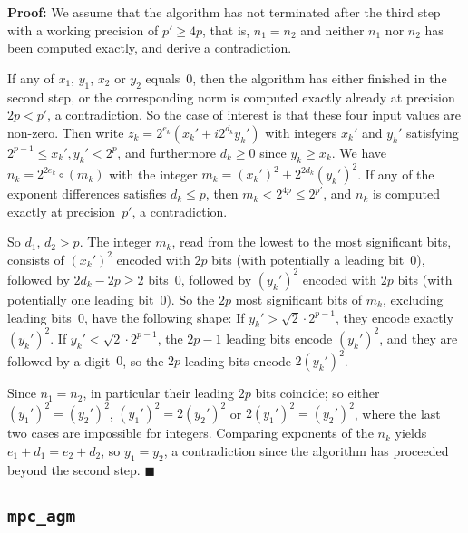 \documentclass [11pt]{article}
\newcommand {\round}{\operatorname {\circ}}
\renewcommand {\leq}{\leqslant}
\renewcommand {\geq}{\geqslant}
\newenvironment{proof}{\noindent \textbf {Proof:}}{{\hspace* {\fill}$\blacksquare$}}
\begin{document}
\begin {proof}
We assume that the algorithm has not terminated after the third step with a
working precision of $p' \geq 4p$, that is, $n_1 = n_2$ and neither
$n_1$ nor $n_2$ has been computed exactly, and derive a contradiction.

If any of $x_1$, $y_1$, $x_2$ or $y_2$ equals~$0$, then the algorithm has
either finished in the second step, or the corresponding norm is computed
exactly already at precision $2p < p'$, a contradiction.
So the case of interest is that these four input values are non-zero.
Then write $z_k = 2^{e_k} (x_k' + i 2^{d_k} y_k')$ with integers
$x_k'$ and $y_k'$ satisfying $2^{p-1} \leq x_k', y_k' < 2^p$, and
furthermore $d_k \geq 0$ since $y_k \geq x_k$.
We have
$n_k = 2^{2 e_k} \round (m_k)$ with the integer
$m_k = (x_k')^2 + 2^{2 d_k} (y_k')^2$.
If any of the exponent differences satisfies $d_k \leq p$, then
$m_k < 2^{4 p} \leq 2^{p'}$, and $n_k$ is computed exactly at precision~$p'$,
a contradiction.

So $d_1$, $d_2 > p$. The integer $m_k$, read from the lowest to the most
significant bits, consists of $(x_k')^2$ encoded with $2 p$ bits (with
potentially a leading bit~$0$), followed by $2 d_k - 2 p \geq 2$ bits~$0$,
followed by $(y_k')^2$ encoded with $2 p$ bits (with potentially one leading
bit~$0$).
So the $2 p$ most significant bits of $m_k$, excluding leading
bits~$0$, have the following shape:
If $y_k' > \sqrt 2 \cdot 2^{p-1}$, they encode exactly $(y_k')^2$.
If $y_k' < \sqrt 2 \cdot 2^{p-1}$, the $2 p - 1$ leading bits encode
$(y_k')^2$, and they are followed by a digit~$0$, so the $2 p$ leading
bits encode $2 (y_k')^2$.

Since $n_1 = n_2$, in particular their leading $2 p$ bits coincide;
so either $(y_1')^2 = (y_2')^2$, $(y_1')^2 = 2 (y_2')^2$ or
$2 (y_1')^2 = (y_2')^2$, where the last two cases are impossible
for integers.
Comparing exponents of the $n_k$ yields
$e_1 + d_1 = e_2 + d_2$, so $y_1 = y_2$,
a contradiction since the algorithm has proceeded beyond the second step.
\end {proof}


\subsection{\texttt {mpc\_agm}}
\label {ssec:agm}
\end{document}
